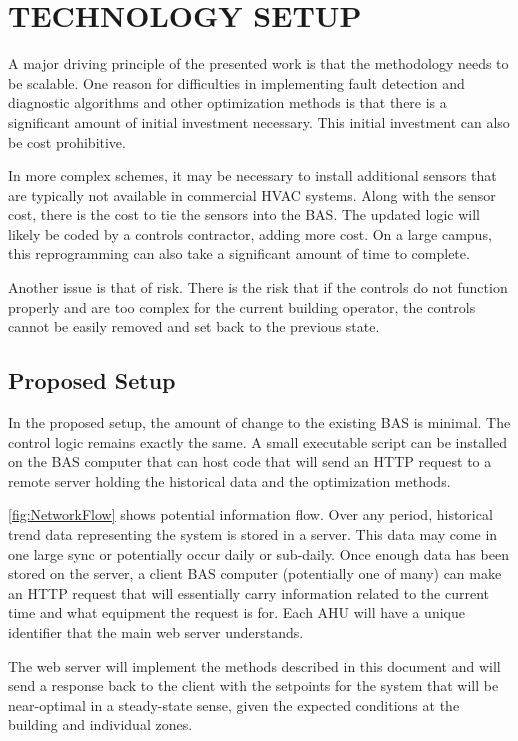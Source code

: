 \chapter{\texorpdfstring{\MakeUppercase{Technology Setup}}{Technology Setup}}

A major driving principle of the presented work is that the methodology
needs to be scalable. One reason for difficulties in implementing fault
detection and diagnostic algorithms and other optimization methods is
that there is a significant amount of initial investment necessary. This
initial investment can also be cost prohibitive. 

In more complex schemes, it may be necessary to install additional
sensors that are typically not available in commercial HVAC systems.
Along with the sensor cost, there is the cost to tie the sensors into the
BAS. The updated logic will likely be coded by a controls contractor,
adding more cost. On a large campus, this reprogramming can also take a
significant amount of time to complete. 

Another issue is that of risk. There is the risk that if the controls do
not function properly and are too complex for the current building
operator, the controls cannot be easily removed and set back to the 
previous state. 

\section{Proposed Setup}

In the proposed setup, the amount of change to the existing BAS is
minimal. The control logic remains exactly the same. A small executable
script can be installed on the BAS computer that can host code that will
send an HTTP request to a remote server holding the historical data and
the optimization methods. 


\figref{} \ref{fig:NetworkFlow} shows potential information flow. Over
any period, historical trend data representing the system is stored
in a server. This data may come in one large sync or potentially occur
daily or sub-daily. Once enough data has been stored on the server, a
client BAS computer (potentially one of many) can make an HTTP request
that will essentially carry information related to the current time and
what equipment the request is for. Each AHU will have a unique
identifier that the main web server understands. 

The web server will implement the methods described in this document and
will send a response back to the client with the setpoints for the
system that will be near-optimal in a steady-state sense, given the
expected conditions at the building and individual zones. 

